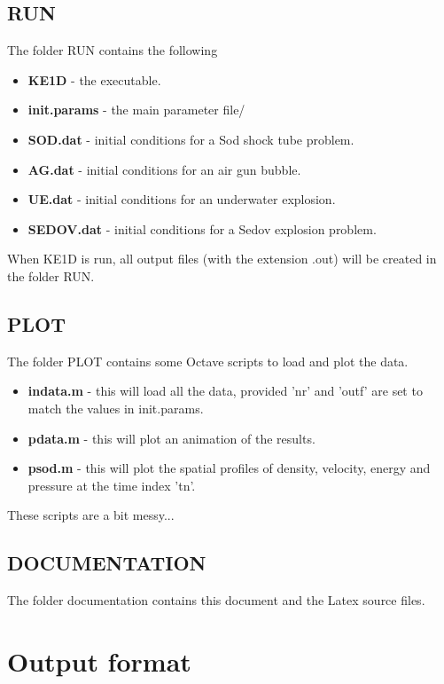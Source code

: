\documentclass{article}
\begin{document}
\subsection{RUN}
The folder RUN contains the following
\begin{itemize}
\item \textbf{KE1D} - the executable.
\item \textbf{init.params} - the main parameter file/
\item \textbf{SOD.dat} - initial conditions for a Sod shock tube problem.
\item \textbf{AG.dat} - initial conditions for an air gun bubble.
\item \textbf{UE.dat} - initial conditions for an underwater explosion.
\item \textbf{SEDOV.dat} - initial conditions for a Sedov explosion problem.
\end{itemize}
When KE1D is run, all output files (with the extension .out) will be created in the folder RUN.

\subsection{PLOT}
The folder PLOT contains some Octave scripts to load and plot the data.
\begin{itemize}
\item \textbf{indata.m} - this will load all the data, provided 'nr' and 'outf' are set to match the values in init.params.
\item \textbf{pdata.m} - this will plot an animation of the results.
\item \textbf{psod.m} - this will plot the spatial profiles of density, velocity, energy and pressure at the time index 'tn'.
\end{itemize}

These scripts are a bit messy...

\subsection{DOCUMENTATION}
The folder documentation contains this document and the Latex source files.

\section{Output format}
\end{document}
